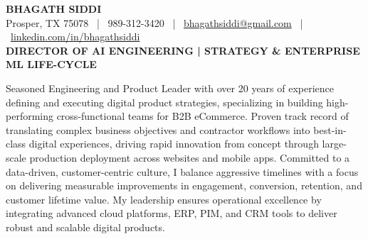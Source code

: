\documentclass[9pt, letterpaper]{extarticle}
\begin{document}
\begin{center}
    {\huge \textbf{BHAGATH SIDDI}} \\
    \vspace{2pt}
    \small Prosper, TX 75078 \ | \ 989-312-3420 \ | \ \href{mailto:bhagathsiddi@gmail.com}{bhagathsiddi@gmail.com} \ | \ \href{https://www.linkedin.com/in/bhagathsiddi}{linkedin.com/in/bhagathsiddi} \\
    \vspace{4pt} 
    \textbf{\large DIRECTOR OF AI ENGINEERING | STRATEGY \& ENTERPRISE ML LIFE-CYCLE}
\end{center}

\vspace{-4pt}
{
\small \centering
Seasoned Engineering and Product Leader with over 20 years of experience defining and executing digital product strategies, specializing in building high-performing cross-functional teams for B2B eCommerce. Proven track record of translating complex business objectives and contractor workflows into best-in-class digital experiences, driving rapid innovation from concept through large-scale production deployment across websites and mobile apps. Committed to a data-driven, customer-centric culture, I balance aggressive timelines with a focus on delivering measurable improvements in engagement, conversion, retention, and customer lifetime value. My leadership ensures operational excellence by integrating advanced cloud platforms, ERP, PIM, and CRM tools to deliver robust and scalable digital products.
\par}

\vspace{-4pt}

\end{document}
